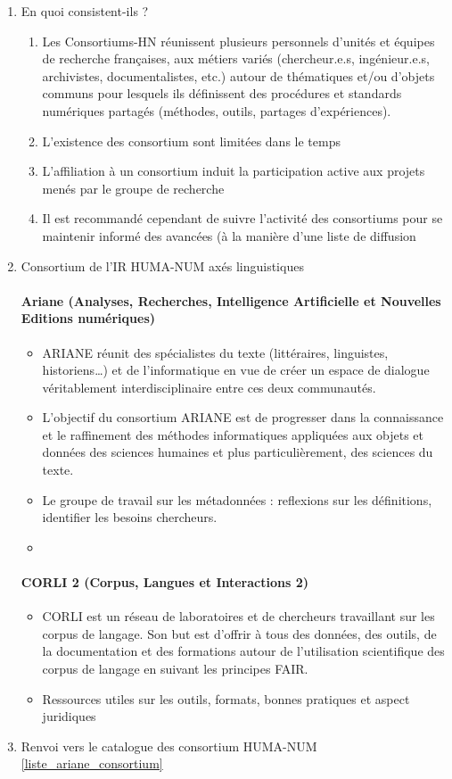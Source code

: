 \documentclass{book}
\newenvironment{titlemize}[1]{%
  \paragraph{#1}
  \begin{itemize}}
  {\end{itemize}}
\begin{document}
\begin{enumerate}
	\item En quoi consistent-ils ?
        \begin{enumerate}
            \item Les Consortiums-HN réunissent plusieurs personnels d’unités et équipes de recherche françaises, aux métiers variés (chercheur.e.s, ingénieur.e.s, archivistes, documentalistes, etc.)  autour de thématiques et/ou d’objets communs pour lesquels ils définissent des procédures et standards numériques partagés (méthodes, outils, partages d’expériences).
            \item L'existence des consortium sont limitées dans le temps
            \item L'affiliation à un consortium induit la participation active aux projets menés par le groupe de recherche
            \item Il est recommandé cependant de suivre l'activité des consortiums pour se maintenir informé des avancées (à la manière d'une liste de diffusion
        \end{enumerate}
	\item Consortium de l'IR HUMA-NUM axés linguistiques
        \begin{titlemize}{Ariane (Analyses, Recherches, Intelligence Artificielle et Nouvelles Editions numériques)}
            \item ARIANE réunit des spécialistes du texte (littéraires, linguistes, historiens…) et de l’informatique en vue de créer un espace de dialogue véritablement interdisciplinaire entre ces deux communautés.
            \item L’objectif du consortium ARIANE est de progresser dans la connaissance et le raffinement des méthodes informatiques appliquées aux objets et données des sciences humaines et plus particulièrement, des sciences du texte.
            \item Le groupe de travail sur les métadonnées : reflexions sur les définitions, identifier les besoins chercheurs.
            \item 
        \end{titlemize}
        \begin{titlemize}{CORLI 2 (Corpus, Langues et Interactions 2)}
            \item CORLI est un réseau de laboratoires et de chercheurs travaillant sur les corpus de langage. Son but est d’offrir à tous des données, des outils, de la documentation et des formations autour de l’utilisation scientifique des corpus de langage en suivant les principes FAIR.
            \item Ressources utiles sur les outils, formats, bonnes pratiques et aspect juridiques
        \end{titlemize}
    \item Renvoi vers le catalogue des consortium HUMA-NUM \ref{liste_ariane_consortium}
    

\end{enumerate}
\end{document}

